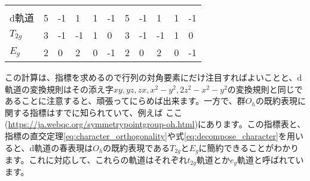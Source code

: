 \documentclass[uplatex,dvipdfmx,a4j]{jsarticle}
\begin{document}
\begin{table}[]
	\begin{tabular}{lllllllllll}
	{\ul }   & {\ul $E$} & {\ul $6C_4$} & {\ul $3C_4^2$} & {\ul $6C_2'$} & {\ul $8C_3$} & {\ul $I$} & {\ul $6IC_4$} & {\ul $3\sigma_h$} & {\ul $6\sigma_d$} & {\ul $8IC_3$} \\
	d軌道      & 5         & -1           & 1              & 1             & -1           & 5         & -1            & 1                 & 1                 & -1            \\
	$T_{2g}$ & 3         & -1           & -1             & 1             & 0            & 3         & -1            & -1                & 1                 & 0             \\
	$E_g$    & 2         & 0            & 2              & 0             & -1           & 2         & 0             & 2                 & 0                 & -1           
	\end{tabular}
	\label{tab:character_table}
\end{table}

この計算は、指標を求めるので行列の対角要素にだけ注目すればよいことと、d軌道の変換規則はその添え字$xy, yz, zx, x^2-y^2, 2z^2-x^2-y^2$の変換規則と同じであることに注意すると、頑張ってにらめば出来ます。一方で、群$O_h$の既約表現に関する指標はすでに知られていて、例えば	ここ(\url{https://ja.webqc.org/symmetrypointgroup-oh.html})にあります。この指標表と、指標の直交定理\ref{eq:character_orthogonality}や式\ref{eq:decompose_character}を用いると、d軌道の春表現は$O_h$の既約表現である$T_{2g}$と$E_g$に簡約できることがわかります。これに対応して、これらの軌道はそれぞれ$t_{2g}$軌道とか$e_g$軌道と呼ばれています。



\end{document}
